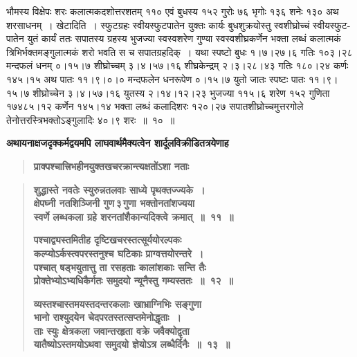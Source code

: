 \documentclass[11pt, openany]{book}
\begin{document}
\begin{sloppypar}
भौमस्य विक्षेपः शरः कलात्मकदशोत्तरशतम् ११० एवं बुधस्य १५२ गुरोः ७६ भृगोः १३६ शनेः १३० अथ शरसाधनम्~। खेटादिति~। स्फुटग्रहः स्वीयस्फुटपातेन युक्तः कार्यः बुधशुक्रयोस्तु स्वशीघ्रोच्चं स्वीयस्फुट-पातेन युतं कार्यं ततः सपातस्य ग्रहस्य भुजज्या स्वस्वशरेण गुण्या स्वस्वशीघ्रकर्णेन भक्ता लब्धं कलात्मकं त्रिभिर्भक्तमङ्गुलात्मकं शरो भवति स च सपातग्रहदिक्~। यथा स्पष्टो बुधः १।७।२७।६ गतिः १०३।२८ मन्दफलं धनम् ०।१५।७ शीघ्रोच्चम् ३।४।५७।१६ शीघ्रकेन्द्रम् २।३।२८।४३ गतिः १८०।२४ कर्णः १४५।१५ अथ पातः ११।९।०।० मन्दफलेन धनरूपेण ०।१५।७ युतो जातः स्पष्टः पातः ११।९।१५।७ शीघ्रोच्चेन ३।४।५७।१६ युतस्य २।१४।१२।२३ भुजज्या ११५।६ शरेण १५२ गुणिता १७४८५।१२ कर्णेन १४५।१४ भक्ता लब्धं कलादिशरः १२०।२७ सपातशीघ्रोच्चमुत्तरगोले तेनोत्तरस्त्रिभक्तोऽङ्गुलादिः ४०।९ शरः~॥~१०~॥\\
\end{sloppypar}

{\small \textbf{अथायनाक्षजदृक्कर्मद्वयमपि लाघवार्थमैक्यत्वेन शार्दूलविक्रीडितत्रयेणाह\textendash }}

 \label{6.11.1}
\begin{quote}
{\large \textbf{{\color{purple}प्राक्पश्चात्त्रिभहीनयुक्तखचरक्रान्त्यक्षतोंऽशा नताः}}}
\end{quote}

\newpage

 \label{6.11}
\begin{quote}
{\large \textbf{{\color{purple}शुद्धास्ते नवतेः स्युरुन्नतलवाः साध्ये पृथक्तज्ज्यके~।\\
क्षेपघ्नी नतशिञ्जिनी गुण\textendash \,३\textendash \,गुणा भक्तोनतांशज्यया\\
स्वर्णे लब्धकला ग्रहे शरनतांशैकान्यदिक्त्वे क्रमात्~॥~११~॥}}
\vspace{1mm}

 \label{6.12}
\textbf{{\color{purple}पश्चाद्व्यस्तमितीह दृष्टिखचरस्तत्सूर्ययोरल्पकः \\
कल्प्योऽर्कस्त्वपरस्तनुश्च घटिकाः प्राग्वत्तयोरन्तरे~। \\
पश्चात् षड्भयुतात्तु ता रसहताः कालांशकाः सन्ति तैः \\
प्रोक्तेभ्योऽभ्यधिकैर्गतः समुदयो न्यूनैस्तु गम्यस्ततः~॥~१२~॥}}
\vspace{1mm}

 \label{6.13}
\textbf{{\color{purple}व्यस्तश्चास्तमयस्तदन्तरकलाः खाभ्राग्निभिः सङ्गुणा\\
भानो राश्युदयेन चेदपरतस्तत्सप्तमेनोद्धृताः~। \\
ताः स्युः क्षेत्रकला जवान्तरहृता वक्रे जवैक्योद्वृता \\
यातैष्योऽस्तमयोऽथवा समुदयो ज्ञेयोऽत्र लब्धैर्दिनैः~॥~१३~॥}}}
\end{quote}
\end{document}
